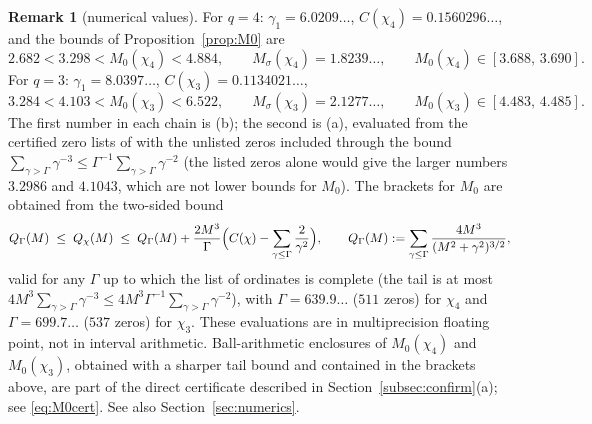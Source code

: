 \documentclass[11pt]{amsart}
\theoremstyle{definition}
\newtheorem{remark}[theorem]{Remark}
\numberwithin{equation}{section}
\begin{document}
\begin{remark}[numerical values]\label{rem:M0values}
For $q=4$: $\gamma_1=6.0209\ldots$, $C(\chi_4)=0.1560296\ldots$, and
the bounds of Proposition~\ref{prop:M0} are
\[
2.682<3.298<M_0(\chi_4)<4.884,\qquad M_\sigma(\chi_4)=1.8239\ldots,
\qquad M_0(\chi_4)\in[3.688,\,3.690].
\]
For $q=3$: $\gamma_1=8.0397\ldots$, $C(\chi_3)=0.1134021\ldots$,
\[
3.284<4.103<M_0(\chi_3)<6.522,\qquad M_\sigma(\chi_3)=2.1277\ldots,
\qquad M_0(\chi_3)\in[4.483,\,4.485].
\]
The first number in each chain is (b); the second is (a), evaluated
from the certified zero lists of \cite[\S7]{WR} with the unlisted
zeros included through the bound
$\sum_{\gamma>\Gamma}\gamma^{-3}\le\Gamma^{-1}\sum_{\gamma>\Gamma}\gamma^{-2}$
(the listed zeros alone would give the larger numbers $3.2986$ and
$4.1043$, which are not lower bounds for $M_0$). The brackets for
$M_0$ are obtained from the two-sided bound
\begin{equation}\label{eq:Qenclose}
Q_\Gamma(M)\;\le\;Q_\chi(M)\;\le\;Q_\Gamma(M)
+\frac{2M^3}{\Gamma}\Bigl(C(\chi)-\sum_{\gamma\le\Gamma}\frac{2}{\gamma^2}\Bigr),
\qquad Q_\Gamma(M):=\sum_{\gamma\le\Gamma}\frac{4M^3}{(M^2+\gamma^2)^{3/2}},
\end{equation}
valid for any $\Gamma$ up to which the list of ordinates is complete
(the tail is at most $4M^3\sum_{\gamma>\Gamma}\gamma^{-3}\le
4M^3\Gamma^{-1}\sum_{\gamma>\Gamma}\gamma^{-2}$), with
$\Gamma=639.9\ldots$ ($511$ zeros) for $\chi_4$ and
$\Gamma=699.7\ldots$ ($537$ zeros) for $\chi_3$. These evaluations
are in multiprecision floating point, not in interval arithmetic.
Ball-arithmetic enclosures of $M_0(\chi_4)$ and $M_0(\chi_3)$,
obtained with a sharper tail bound and contained in the brackets
above, are part of the direct certificate described in
Section~\ref{subsec:confirm}(a); see \eqref{eq:M0cert}. See also Section~\ref{sec:numerics}.
\end{remark}
\end{document}
